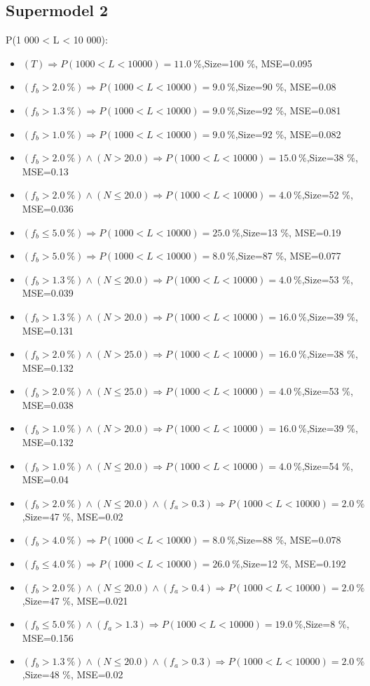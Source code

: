 \documentclass[numbered]{CSL}
\begin{document}
\subsection{Supermodel 2}
P(1 000 < L < 10 000):
\begin{itemize}
\item $(T) \Rightarrow P(1 000 < L < 10 000) = 11.0~\%$,\hfill Size=100 \%, MSE=0.095
\item $(f_b > 2.0~\%) \Rightarrow P(1 000 < L < 10 000) = 9.0~\%$,\hfill Size=90 \%, MSE=0.08
\item $(f_b > 1.3~\%) \Rightarrow P(1 000 < L < 10 000) = 9.0~\%$,\hfill Size=92 \%, MSE=0.081
\item $(f_b > 1.0~\%) \Rightarrow P(1 000 < L < 10 000) = 9.0~\%$,\hfill Size=92 \%, MSE=0.082
\item $(f_b > 2.0~\%) \land (N > 20.0) \Rightarrow P(1 000 < L < 10 000) = 15.0~\%$,\hfill Size=38 \%, MSE=0.13
\item $(f_b > 2.0~\%) \land (N \leq 20.0) \Rightarrow P(1 000 < L < 10 000) = 4.0~\%$,\hfill Size=52 \%, MSE=0.036
\item $(f_b \leq 5.0~\%) \Rightarrow P(1 000 < L < 10 000) = 25.0~\%$,\hfill Size=13 \%, MSE=0.19
\item $(f_b > 5.0~\%) \Rightarrow P(1 000 < L < 10 000) = 8.0~\%$,\hfill Size=87 \%, MSE=0.077
\item $(f_b > 1.3~\%) \land (N \leq 20.0) \Rightarrow P(1 000 < L < 10 000) = 4.0~\%$,\hfill Size=53 \%, MSE=0.039
\item $(f_b > 1.3~\%) \land (N > 20.0) \Rightarrow P(1 000 < L < 10 000) = 16.0~\%$,\hfill Size=39 \%, MSE=0.131
\item $(f_b > 2.0~\%) \land (N > 25.0) \Rightarrow P(1 000 < L < 10 000) = 16.0~\%$,\hfill Size=38 \%, MSE=0.132
\item $(f_b > 2.0~\%) \land (N \leq 25.0) \Rightarrow P(1 000 < L < 10 000) = 4.0~\%$,\hfill Size=53 \%, MSE=0.038
\item $(f_b > 1.0~\%) \land (N > 20.0) \Rightarrow P(1 000 < L < 10 000) = 16.0~\%$,\hfill Size=39 \%, MSE=0.132
\item $(f_b > 1.0~\%) \land (N \leq 20.0) \Rightarrow P(1 000 < L < 10 000) = 4.0~\%$,\hfill Size=54 \%, MSE=0.04
\item $(f_b > 2.0~\%) \land (N \leq 20.0) \land (f_a > 0.3) \Rightarrow P(1 000 < L < 10 000) = 2.0~\%$,\hfill Size=47 \%, MSE=0.02
\item $(f_b > 4.0~\%) \Rightarrow P(1 000 < L < 10 000) = 8.0~\%$,\hfill Size=88 \%, MSE=0.078
\item $(f_b \leq 4.0~\%) \Rightarrow P(1 000 < L < 10 000) = 26.0~\%$,\hfill Size=12 \%, MSE=0.192
\item $(f_b > 2.0~\%) \land (N \leq 20.0) \land (f_a > 0.4) \Rightarrow P(1 000 < L < 10 000) = 2.0~\%$,\hfill Size=47 \%, MSE=0.021
\item $(f_b \leq 5.0~\%) \land (f_a > 1.3) \Rightarrow P(1 000 < L < 10 000) = 19.0~\%$,\hfill Size=8 \%, MSE=0.156
\item $(f_b > 1.3~\%) \land (N \leq 20.0) \land (f_a > 0.3) \Rightarrow P(1 000 < L < 10 000) = 2.0~\%$,\hfill Size=48 \%, MSE=0.02
\end{itemize}
\end{document}
